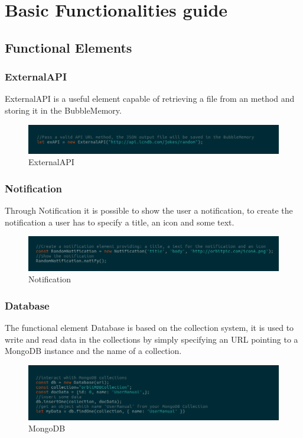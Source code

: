 \section{Basic Functionalities guide}
\subsection{Functional Elements}
\subsubsection{ExternalAPI}
ExternalAPI is a useful element capable of retrieving a  file from an  method and storing it in the BubbleMemory. 
\begin{figure}[H]
	\centering
	\includegraphics[width=14cm]{../../documenti/UserManualFramework/framework_model/1framework_model_api.png}
	\caption{ExternalAPI}
\end{figure}

\subsubsection{Notification}
Through Notification it is possible to show the user a notification, to create the notification a user has to specify a title, an icon and some text. 
\begin{figure}[H]
	\centering
	\includegraphics[width=14cm]{../../documenti/UserManualFramework/framework_model/2framework_model_notification.png}
	\caption{Notification}
\end{figure}

\subsubsection{Database}
The functional element Database is based on the  collection system, it is used to write and read data in the collections by simply specifying an URL pointing to a MongoDB instance and the name of a collection.
\begin{figure}[H]
	\centering
	\includegraphics[width=14cm]{../../documenti/UserManualFramework/framework_model/3framework_model_mongo.png}
	\caption{MongoDB}
\end{figure}

